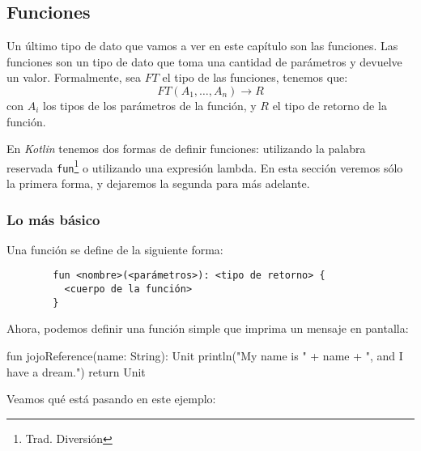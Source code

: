   \subsection{Funciones}
    Un último tipo de dato que vamos a ver en este capítulo son las funciones.
    Las funciones son un tipo de dato que toma una cantidad de parámetros y devuelve un valor.
    Formalmente, sea \(FT\) el tipo de las funciones, tenemos que:
    \[
      FT(A_1, \dots, A_n) \rightarrow R
    \]
    con \(A_i\) los tipos de los parámetros de la función, y \(R\) el tipo de retorno de la función.

    En \textit{Kotlin} tenemos dos formas de definir funciones: utilizando la palabra reservada
    \texttt{fun}\footnote{Trad. Diversión} o utilizando una expresión lambda.
    En esta sección veremos sólo la primera forma, y dejaremos la segunda para más adelante.
    
    \subsubsection{Lo más básico}
      Una función se define de la siguiente forma:

      \begin{verbatim}
        fun <nombre>(<parámetros>): <tipo de retorno> {
          <cuerpo de la función>
        }
      \end{verbatim}

      Ahora, podemos definir una función simple que imprima un mensaje en pantalla:

      \begin{kotlin}
        fun jojoReference(name: String): Unit {
          println("My name is " + name + ", and I have a dream.")
          return Unit
        }
      \end{kotlin}
      
      Veamos qué está pasando en este ejemplo:

